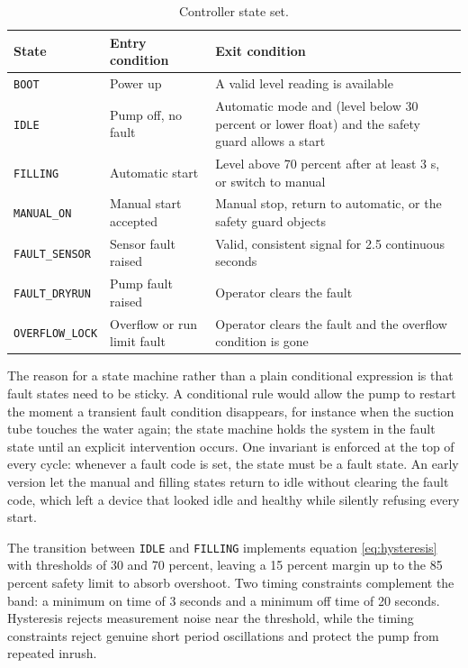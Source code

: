\begin{table}[H]
\caption{Controller state set.}
\label{tab:fsm}
\centering
\renewcommand{\arraystretch}{1.1}
\begin{tabular}{|p{3.1cm}|p{4.6cm}|p{5.2cm}|}
\hline
\rowcolor[HTML]{B7E1F0}
\textbf{State} & \textbf{Entry condition} & \textbf{Exit condition} \\
\hline
\texttt{BOOT} & Power up & A valid level reading is available \\
\hline
\texttt{IDLE} & Pump off, no fault & Automatic mode and (level below 30 percent or lower float) and the safety guard allows a start \\
\hline
\texttt{FILLING} & Automatic start & Level above 70 percent after at least 3 s, or switch to manual \\
\hline
\texttt{MANUAL\_ON} & Manual start accepted & Manual stop, return to automatic, or the safety guard objects \\
\hline
\texttt{FAULT\_SENSOR} & Sensor fault raised & Valid, consistent signal for 2.5 continuous seconds \\
\hline
\texttt{FAULT\_DRYRUN} & Pump fault raised & Operator clears the fault \\
\hline
\texttt{OVERFLOW\_LOCK} & Overflow or run limit fault & Operator clears the fault and the overflow condition is gone \\
\hline
\end{tabular}
\end{table}

The reason for a state machine rather than a plain conditional expression is that fault states need to be sticky. A conditional rule would allow the pump to restart the moment a transient fault condition disappears, for instance when the suction tube touches the water again; the state machine holds the system in the fault state until an explicit intervention occurs. One invariant is enforced at the top of every cycle: whenever a fault code is set, the state must be a fault state. An early version let the manual and filling states return to idle without clearing the fault code, which left a device that looked idle and healthy while silently refusing every start.

The transition between \texttt{IDLE} and \texttt{FILLING} implements equation \eqref{eq:hysteresis} with thresholds of 30 and 70 percent, leaving a 15 percent margin up to the 85 percent safety limit to absorb overshoot. Two timing constraints complement the band: a minimum on time of 3 seconds and a minimum off time of 20 seconds. Hysteresis rejects measurement noise near the threshold, while the timing constraints reject genuine short period oscillations and protect the pump from repeated inrush.

